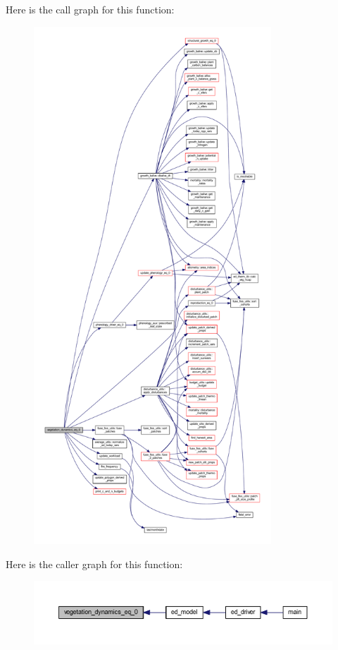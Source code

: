 Here is the call graph for this function\+:\nopagebreak
\begin{figure}[H]
\begin{center}
\leavevmode
\includegraphics[height=550pt]{vegetation__dynamics_8f90_a275be9a740f6c74b8bf5e0a499cb6c49_cgraph}
\end{center}
\end{figure}




Here is the caller graph for this function\+:\nopagebreak
\begin{figure}[H]
\begin{center}
\leavevmode
\includegraphics[width=350pt]{vegetation__dynamics_8f90_a275be9a740f6c74b8bf5e0a499cb6c49_icgraph}
\end{center}
\end{figure}


